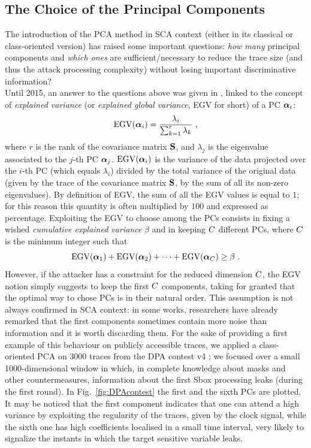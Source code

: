 \subsection{The Choice of the Principal Components}\label{sec:ELV}
The introduction of the PCA method in SCA context (either in its classical or class-oriented version)  has raised some important questions: \textit{how many} principal components and \textit{which ones} are sufficient/necessary to reduce the trace size (and thus the attack processing complexity) without losing important discriminative information?\\

Until 2015, an answer to the questions above was given in \cite{choudary2014efficient}, linked to the concept of {\em explained variance} (or {\em explained global variance}, EGV for short) of a PC $\boldsymbol{\alpha}_i$:
\begin{equation}\label{eq:EGV}
\mathrm{EGV}(\boldsymbol{\alpha}_i) =  \frac{\lambda_i}{\sum_{k=1}^r\lambda_k} \mbox{ ,}
\end{equation}
where $r$ is the rank of the covariance matrix $\textbf{S}$, and $\lambda_j$ is the eigenvalue associated to the $j$-th PC $\boldsymbol{\alpha}_j$. $\mathrm{EGV}(\boldsymbol{\alpha}_i)$ is the variance of the data projected over the $i$-th PC (which equals $\lambda_i$) divided by the total variance of the original data (given by the trace of the covariance matrix $\textbf{S}$, \ie by the sum of all its non-zero eigenvalues). By definition of EGV, the sum of all the EGV values is equal to $1$; for this reason this quantity is often multiplied by $100$ and expressed as percentage.
Exploiting the EGV to choose among the PCs consists in fixing a wished {\em cumulative explained variance} $\beta$ and in keeping $C$ different PCs, where $C$ is the minimum integer such that
\begin{equation}
\mbox{EGV}(\boldsymbol{\alpha}_1) +\mbox{EGV}(\boldsymbol{\alpha}_2) + \dots +\mbox{EGV}(\boldsymbol{\alpha}_C) \geq \beta \mbox{ .}
\end{equation}
However, if the attacker has a constraint for the reduced dimension $C$, the EGV notion simply suggests to keep the first $C$ components, taking for granted that the optimal way to chose PCs is in their natural order. This assumption is not always confirmed in SCA context: in some works, researchers have already remarked that the first components sometimes contain more noise than information \cite{Batina2012,specht} and it is worth discarding them. For the sake of providing a first example of this behaviour on publicly accessible traces, we applied a class-oriented PCA on 3000 traces from the DPA contest v4 \cite{DPAcontest}; we focused over a small 1000-dimensional window in which, in complete knowledge about masks and other countermeasures, information about the first Sbox processing leaks (during the first round). In Fig.~\ref{fig:DPAcontest} the first and the sixth PCs are plotted. It may be noticed that the first component indicates that one can attend a high variance by exploiting the regularity of the traces, given by the clock signal, while the sixth one has high coefficients localised in a small time interval, very likely to signalize the instants in which the target sensitive variable leaks.

